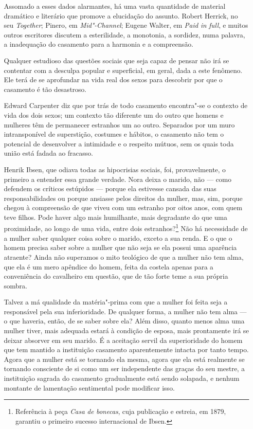 Assomado a esses dados alarmantes, há uma vasta quantidade de material
dramático e literário que promove a elucidação do assunto. Robert
Herrick, no seu \emph{Together}; Pinero, em \emph{Mid"-Channel}; Eugene
Walter, em \emph{Paid in full}, e muitos outros escritores discutem a
esterilidade, a monotonia, a sordidez, numa palavra, a inadequação do
casamento para a harmonia e a compreensão.

Qualquer estudioso das questões sociais que seja capaz de pensar não irá
se contentar com a desculpa popular e superficial, em geral, dada a este fenômeno. Ele
terá de se aprofundar na vida real dos sexos para descobrir por que o
casamento é tão desastroso.

Edward Carpenter diz que por trás de todo casamento encontra"-se o
contexto de vida dos dois sexos; um contexto tão diferente um do outro
que homens e mulheres têm de permanecer estranhos um ao outro.
Separados por um muro intransponível de superstição, costumes e hábitos,
o casamento não tem o potencial de desenvolver a intimidade e o
respeito mútuos, sem os quais toda união está fadada ao fracasso.

Henrik Ibsen, que odiava todas as hipocrisias sociais, foi, provavelmente,
o primeiro a entender essa grande verdade. Nora deixa o marido,
não --- como defendem os críticos estúpidos --- porque ela estivesse
cansada das suas responsabilidades ou porque ansiasse pelos direitos da
mulher, mas, sim, porque chegou à compreensão de que viveu com um
estranho por oitos anos, com quem teve filhos. Pode haver algo mais
humilhante, mais degradante do que uma proximidade, ao longo de uma
vida, entre dois estranhos?\footnote{Referência à peça \textit{Casa de bonecas}, cuja publicação e estreia, em 1879, garantiu o primeiro sucesso internacional de Ibsen.} Não há necessidade de a mulher saber
qualquer coisa sobre o marido, exceto a sua renda. E o que o homem
precisa saber sobre a mulher que não seja se ela possui uma aparência
atraente? Ainda não superamos o mito teológico de que a mulher não tem
alma, que ela é um mero apêndice do homem, feita da costela apenas para
a conveniência do cavalheiro em questão, que de tão forte teme a sua
própria sombra.

Talvez a má qualidade da matéria"-prima com que a mulher foi feita seja a
responsável pela sua inferioridade. De qualquer forma, a mulher não tem
alma --- o que haveria, então, de se saber sobre ela? Além disso, quanto
menos alma uma mulher tiver, mais adequada estará à condição de esposa,
mais prontamente irá se deixar absorver em seu marido. É a aceitação
servil da superioridade do homem que tem mantido a instituição casamento
aparentemente intacta por tanto tempo. Agora que a mulher está se
tornando ela mesma, agora que ela está realmente se tornando consciente
de si como um ser independente das graças do seu mestre, a instituição
sagrada do casamento gradualmente está sendo solapada, e nenhum montante
de lamentação sentimental pode modificar isso.

